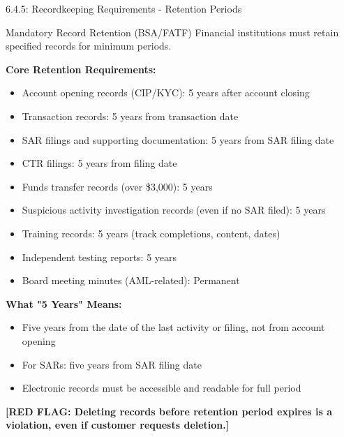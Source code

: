 \documentclass[11pt,a4paper]{beamer}
\newcommand{\redflag}[1]{\textcolor{red!80!black}{\textbf{[RED FLAG: #1]}}}
\begin{document}
\begin{frame}{6.4.5: Recordkeeping Requirements - Retention Periods}
	\begin{block}{Mandatory Record Retention (BSA/FATF)}
		Financial institutions must retain specified records for minimum periods.
	\end{block}
	\textbf{Core Retention Requirements:}
	\begin{itemize}
		\item Account opening records (CIP/KYC): 5 years after account closing
		\item Transaction records: 5 years from transaction date
		\item SAR filings and supporting documentation: 5 years from SAR filing date
		\item CTR filings: 5 years from filing date
		\item Funds transfer records (over \$3,000): 5 years
		\item Suspicious activity investigation records (even if no SAR filed): 5 years
		\item Training records: 5 years (track completions, content, dates)
		\item Independent testing reports: 5 years
		\item Board meeting minutes (AML-related): Permanent
	\end{itemize}
	\textbf{What "5 Years" Means:}
	\begin{itemize}
		\item Five years from the date of the last activity or filing, not from account opening
		\item For SARs: five years from SAR filing date
		\item Electronic records must be accessible and readable for full period
	\end{itemize}
	\redflag{Deleting records before retention period expires is a violation, even if customer requests deletion.}
\end{frame}

\end{document}
